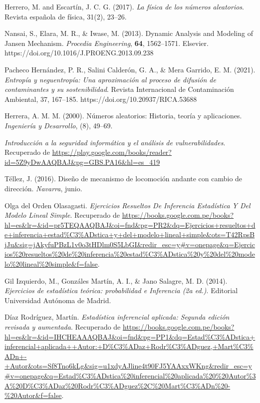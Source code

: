 \begin{thebibliography}{9}

Herrero, M. and Escartín, J. C. G. (2017). 
\emph{La física de los números aleatorios}. 
Revista española de física, 31(2), 23--26.

Nansai, S., Elara, M. R., \& Iwase, M. (2013). 
Dynamic Analysis and Modeling of Jansen Mechanism. 
\textit{Procedia Engineering}, \textbf{64}, 1562--1571. 
Elsevier. 
https://doi.org/10.1016/J.PROENG.2013.09.238

  
Pacheco Hernández, P. R., Salini Calderón, G. A., \& Mera Garrido, E. M. (2021). 
\textit{Entropía y neguentropía: Una aproximación al proceso de difusión de contaminantes y su sostenibilidad}. 
Revista Internacional de Contaminación Ambiental, 37, 167--185. 
https://doi.org/10.20937/RICA.53688

Herrera, A. M. M. (2000). Números aleatorios: Historia, teoría y aplicaciones. \textit{Ingeniería y Desarrollo}, (8), 49--69.

\textit{Introducción a la seguridad informática y el análisis de vulnerabilidades}. Recuperado de \url{https://play.google.com/books/reader?id=5Z9yDwAAQBAJ&pg=GBS.PA16&hl=es_419}


Téllez, J. (2016). Diseño de mecanismo de locomoción andante con cambio de dirección. \textit{Navarra}, junio.

  Olga del Orden Olasagasti. \textit{Ejercicios Resueltos De Inferencia Estadística Y Del Modelo Lineal Simple}. Recuperado de \url{https://books.google.com.pe/books?hl=es&lr=&id=pr5TEQAAQBAJ&oi=fnd&pg=PR2&dq=Ejercicios+resueltos+de+inferencia+estad%C3%ADstica+y+del+modelo+lineal+simple&ots=T42RpsBjJu&sig=jAkyfuPBzL1v0o3tHDlm0S5LbGI&redir_esc=y#v=onepage&q=Ejercicios%20resueltos%20de%20inferencia%20estad%C3%ADstica%20y%20del%20modelo%20lineal%20simple&f=false}.

  Gil Izquierdo, M., Gonzáles Martín, A. I., \& Jano Salagre, M. D. (2014). \textit{Ejercicios de estadística teórica: probabilidad e Inferencia (2a ed.)}. Editorial Universidad Autónoma de Madrid.

  Díaz Rodríguez, Martín. \textit{Estadística inferencial aplicada: Segunda edición revisada y aumentada}. Recuperado de \url{https://books.google.com.pe/books?hl=es&lr=&id=IHCHEAAAQBAJ&oi=fnd&pg=PP1&dq=Estad%C3%ADstica+inferencial+aplicada++Autor:+D%C3%ADaz+Rodr%C3%ADguez,+Mart%C3%ADn+-+Autor&ots=Sf8Tno6kLg&sig=u1xdyAJline4t90FJ5YAAxxWKng&redir_esc=y#v=onepage&q=Estad%C3%ADstica%20inferencial%20aplicada%20%20Autor%3A%20D%C3%ADaz%20Rodr%C3%ADguez%2C%20Mart%C3%ADn%20-%20Autor&f=false}.


\end{thebibliography}
